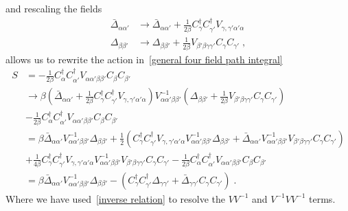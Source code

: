 \documentclass{article}
\begin{document}
and rescaling the fields
\begin{align}
    \bar{\Delta}_{\alpha \alpha'} &\rightarrow \bar{\Delta}_{\alpha \alpha'} + \frac{1}{2\beta}  C^{\dagger}_{\gamma} C^{\dagger}_{\gamma'} V_{\gamma,\gamma' \alpha' \alpha}\nonumber\\
         \Delta_{\beta \beta'}    &\rightarrow \Delta_{\beta \beta'} + \frac{1}{2\beta} V_{\beta' \beta \gamma \gamma'} C_{\gamma} C_{\gamma'}\label{rescaling hs-fields}\;,
\end{align}
allows us to rewrite the action in~\cref{general four field path integral} 
\begin{align}
       S &= -\frac{1}{2\beta}C^{\dagger}_{\alpha} C^{\dagger}_{\alpha'} V_{\alpha \alpha' \beta \beta'} C_{\beta} C_{\beta'} \nonumber\\
       &\rightarrow \beta \left(\bar{\Delta}_{\alpha \alpha'} + \frac{1}{2 \beta} C^{\dagger}_{\gamma} C^{\dagger}_{\gamma'} V_{\gamma,\gamma' \alpha' \alpha}\right) V^{-1}_{\alpha \alpha' \beta \beta'} 
       \left(\Delta_{\beta \beta'} + \frac{1}{2 \beta} V_{\beta' \beta \gamma \gamma'} C_{\gamma} C_{\gamma'}\right) \nonumber \\
       &- \frac{1}{2\beta}C^{\dagger}_{\alpha} C^{\dagger}_{\alpha'} V_{\alpha \alpha' \beta \beta'} C_{\beta} C_{\beta'} \label{hs-transformation}\\
       &= \beta \bar{\Delta}_{\alpha \alpha'} V^{-1}_{\alpha \alpha' \beta \beta'} \Delta_{\beta \beta'} + \frac{1}{2}\left( C^{\dagger}_{\gamma} C^{\dagger}_{\gamma'} V_{\gamma,\gamma' \alpha' \alpha}  V^{-1}_{\alpha \alpha' \beta \beta'} \Delta_{\beta \beta'}+ \bar{\Delta}_{\alpha \alpha'} V^{-1}_{\alpha \alpha' \beta \beta'} V_{\beta' \beta \gamma \gamma'} C_{\gamma} C_{\gamma'}\right) \nonumber \\
       &+ \frac{1}{4\beta} C^{\dagger}_{\gamma} C^{\dagger}_{\gamma'} V_{\gamma,\gamma' \alpha' \alpha}  V^{-1}_{\alpha \alpha' \beta \beta'} V_{\beta' \beta \gamma \gamma'} C_{\gamma} C_{\gamma'}  - \frac{1}{2\beta}C^{\dagger}_{\alpha} C^{\dagger}_{\alpha'} V_{\alpha \alpha' \beta \beta'} C_{\beta} C_{\beta'} \nonumber\\
       &= \beta\bar{\Delta}_{\alpha \alpha'} V^{-1}_{\alpha \alpha' \beta \beta'} \Delta_{\beta \beta'} - \left( C^{\dagger}_{\gamma} C^{\dagger}_{\gamma'} \Delta_{\gamma \gamma'}+ \bar{\Delta}_{\gamma \gamma'}  C_{\gamma} C_{\gamma'}\right) \nonumber \;.
\end{align}
Where we have used~\cref{inverse relation} to resolve the $V V^{-1}$ and $V^{-1} V V^{-1}$ terms. 
\end{document}
